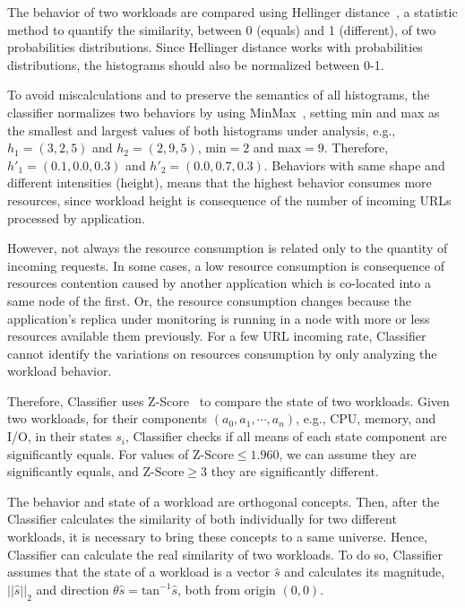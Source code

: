 The behavior of two workloads are compared using Hellinger distance~\cite{?}, a
statistic method to quantify the similarity, between 0 (equals) and 1
(different), of two probabilities distributions. Since Hellinger distance works
with probabilities distributions, the histograms should also be normalized
between 0-1.

To avoid miscalculations and to preserve the semantics of all histograms, the
classifier normalizes two behaviors by using MinMax~\cite{?}, setting min and
max as the smallest and largest values of both histograms under analysis, e.g.,
$h_1 = (3, 2, 5)$ and $h_2 = (2, 9, 5)$, $\text{min} = 2$ and $\text{max} = 9$.
Therefore, $h'_1 = (0.1, 0.0, 0.3)$ and $h'_2 = (0.0, 0.7, 0.3)$. Behaviors with
same shape and different intensities (height), means that the highest behavior
consumes more resources, since workload height is consequence of the number of
incoming URLs processed by application.

However, not always the resource consumption is related only to the quantity of
incoming requests. In some cases, a low resource consumption is consequence of
resources contention caused by another application which is co-located into a
same node of the first. Or, the resource consumption changes because the
application's replica under monitoring is running in a node with more or less
resources available them previously. For a few URL incoming rate, Classifier
cannot identify the variations on resources consumption by only analyzing the
workload behavior.

Therefore, Classifier uses Z-Score~\cite{?} to compare the state of two
workloads.  Given two workloads, for their components $(a_0, a_1, \cdots,
a_n)$, e.g., CPU, memory, and I/O, in their states $s_i$, Classifier checks if
all means of each state component are significantly equals. For values of
$\text{Z-Score} \leq 1.960$, we can assume they are significantly equals, and
$\text{Z-Score} \geq 3$ they are significantly different.

The behavior and state of a workload are orthogonal concepts. Then, after the
Classifier calculates the similarity of both individually for two different
workloads,  it is necessary to bring these concepts to a same universe. Hence,
Classifier can calculate the real similarity of two workloads.  To do so,
Classifier assumes that the state of a workload is a vector $\hat{s}$ and
calculates its magnitude, $||\hat{s}||_2$ and direction $\theta \hat{s} =
\text{tan}^{-1} \hat{s}$, both from origin $(0,0)$.

